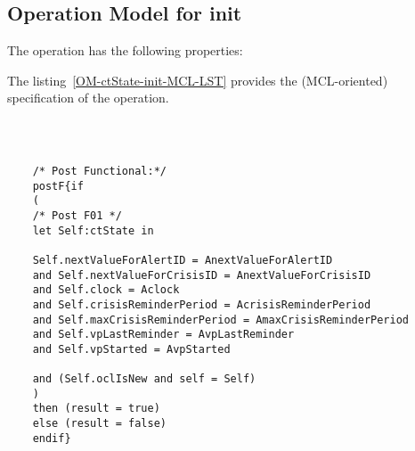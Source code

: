 \subsection{Operation Model for init}

\label{OM-init}


The  operation has the following properties:

	\begin{operationmodel}



		


	\end{operationmodel}



	\vspace{1cm}
	The listing~\ref{OM-ctState-init-MCL-LST} provides the \msrmessir (MCL-oriented) specification of the operation.
	
	\scriptsize
	\vspace{0.5cm}
	\begin{lstlisting}[style=MessirStyle,firstnumber=auto,captionpos=b,caption={\msrmessir (MCL-oriented) specification of the operation \emph{init}.},label=OM-ctState-init-MCL-LST]

	
	
	/* Post Functional:*/ 
	postF{if
	(
	/* Post F01 */
	let Self:ctState in
	
	Self.nextValueForAlertID = AnextValueForAlertID
	and Self.nextValueForCrisisID = AnextValueForCrisisID
	and Self.clock = Aclock
	and Self.crisisReminderPeriod = AcrisisReminderPeriod
	and Self.maxCrisisReminderPeriod = AmaxCrisisReminderPeriod
	and Self.vpLastReminder = AvpLastReminder
	and Self.vpStarted = AvpStarted
	
	and (Self.oclIsNew and self = Self)
	)
	then (result = true)
	else (result = false)
	endif}
	
	
	\end{lstlisting}
	\normalsize 
	
	
	
	





